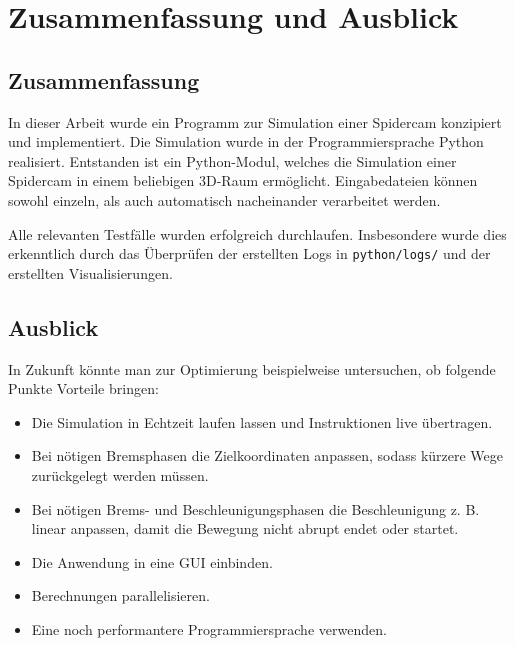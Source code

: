 \section{Zusammenfassung und Ausblick}
\label{sec:zusammenfassung_und_ausblick}

\subsection{Zusammenfassung}
\label{ssec:zusammenfassung}

In dieser Arbeit wurde ein Programm zur Simulation einer Spidercam konzipiert und implementiert.
Die Simulation wurde in der Programmiersprache Python realisiert.
Entstanden ist ein Python-Modul, welches die Simulation einer Spidercam in einem beliebigen 3D-Raum ermöglicht.
Eingabedateien können sowohl einzeln, als auch automatisch nacheinander verarbeitet werden.

Alle relevanten Testfälle wurden erfolgreich durchlaufen.
Insbesondere wurde dies erkenntlich durch das Überprüfen der erstellten Logs in \texttt{python/logs/} und der erstellten Visualisierungen.

\subsection{Ausblick}
\label{ssec:ausblick}

In Zukunft könnte man zur Optimierung beispielweise untersuchen, ob folgende Punkte Vorteile bringen:
\begin{itemize}
    \item Die Simulation in Echtzeit laufen lassen und Instruktionen live übertragen.
    \item Bei nötigen Bremsphasen die Zielkoordinaten anpassen, sodass kürzere Wege zurückgelegt werden müssen.
    \item Bei nötigen Brems- und Beschleunigungsphasen die Beschleunigung z. B. linear anpassen, damit die Bewegung nicht abrupt endet oder startet.
    \item Die Anwendung in eine GUI einbinden.
    \item Berechnungen parallelisieren.
    \item Eine noch performantere Programmiersprache verwenden.
\end{itemize}